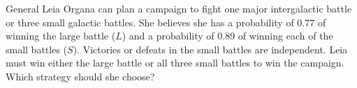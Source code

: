 \documentclass[noanswers]{exam}
\begin{document}
\begin{questions}
\vspace{3mm}


\question General Leia Organa can plan a campaign to fight one major intergalactic battle or three small galactic battles. She believes she has a probability of 0.77 of winning the large battle ($L$) and a probability of 0.89 of winning each of the small battles ($S$). Victories or defeats in the small battles are independent. Leia must win either the large battle or all three small battles to win the campaign. Which strategy should she choose?

\vspace{3mm}

\end{questions}
\end{document}
